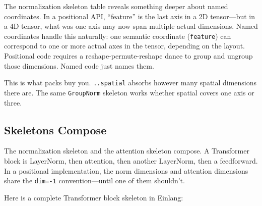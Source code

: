 \documentclass[11pt,titlepage]{article}
\begin{document}
\vspace{2em}

The normalization skeleton table reveals something deeper about named
coordinates. In a positional API, ``feature'' is the last axis in a 2D
tensor---but in a 4D tensor, what was one axis may now span multiple
actual dimensions. Named coordinates handle this naturally: one semantic
coordinate (\texttt{feature}) can correspond to one or more actual axes
in the tensor, depending on the layout. Positional code requires a
reshape-permute-reshape dance to group and ungroup those dimensions.
Named code just names them.

This is what packs buy you. \texttt{..spatial} absorbs however many
spatial dimensions there are. The same \texttt{GroupNorm} skeleton works
whether spatial covers one axis or three.

\vspace{2em}

\hypertarget{skeletons-compose}{%
\subsection{Skeletons Compose}\label{skeletons-compose}}

The normalization skeleton and the attention skeleton compose. A
Transformer block is LayerNorm, then attention, then another LayerNorm,
then a feedforward. In a positional implementation, the norm dimensions
and attention dimensions share the \texttt{dim=-1} convention---until
one of them shouldn't.

Here is a complete Transformer block skeleton in Einlang:
\end{document}
